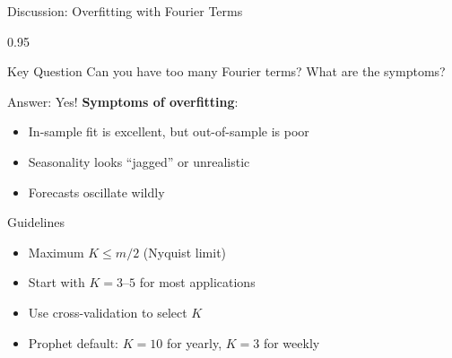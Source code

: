 \documentclass[9pt, aspectratio=169, t]{beamer}
\begin{document}
\begin{frame}{Discussion: Overfitting with Fourier Terms}
    \begin{cminipage}{0.95\textwidth}
    \vspace{-0.3cm}
    {\scriptsize
    \begin{alertblock}{Key Question}
        Can you have too many Fourier terms? What are the symptoms?
    \end{alertblock}
    \begin{block}{Answer: Yes!}
        \textbf{Symptoms of overfitting}:
        \begin{itemize}\setlength{\itemsep}{0pt}
            \item In-sample fit is excellent, but out-of-sample is poor
            \item Seasonality looks ``jagged'' or unrealistic
            \item Forecasts oscillate wildly
        \end{itemize}
    \end{block}
    \begin{exampleblock}{Guidelines}
        \begin{itemize}\setlength{\itemsep}{0pt}
            \item Maximum $K \leq m/2$ (Nyquist limit)
            \item Start with $K = 3$--$5$ for most applications
            \item Use cross-validation to select $K$
            \item Prophet default: $K=10$ for yearly, $K=3$ for weekly
        \end{itemize}
    \end{exampleblock}
    }
    \end{cminipage}
\end{frame}
\end{document}
